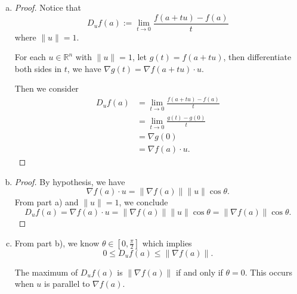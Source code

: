 \begin{Exercise}
\begin{enumerate}[a)]
\item
\begin{proof}
Notice that
$$
D_u f(a) := \lim_{t\to 0}\frac{f(a+t u)-f(a)}{t}
$$
where $\| u \| = 1$.

For each $u\in\mathbb{R}^n$ with $\| u \| = 1$, let $g(t) = f(a+t u)$, then differentiate both sides in $t$, we have $\nabla g(t) = \nabla f(a+t u)\cdot u$.

Then we consider
\begin{align*}
D_u f(a) 
&= \lim_{t\to 0}\frac{f(a+t u)-f(a)}{t} \\
&= \lim_{t\to 0}\frac{g(t)-g(0)}{t} \\
&= \nabla g(0) \\
&= \nabla f(a)\cdot u.
\end{align*}
\end{proof}

\item
\begin{proof}
By hypothesis, we have
$$
\nabla f(a) \cdot u = \| \nabla f(a) \| \| u \| \cos \theta.
$$
From part a) and $\| u \| = 1$, we conclude
$$
D_u f(a) = \nabla f(a)\cdot u = \| \nabla f(a) \| \| u \| \cos \theta =  \| \nabla f(a) \| \cos \theta.
$$
\end{proof}

\item
\begin{solution}
From part b), we know $\theta \in [0,\frac{\pi}{2}]$ which implies 
$$
0\leq D_u f(a) \leq \| \nabla f(a) \|.
$$

The maximum of $D_u f(a)$ is $\| \nabla f(a) \|$ if and only if $\theta = 0$. This occurs when $u$ is parallel to $\nabla f(a)$.
\end{solution}
\end{enumerate}
\end{Exercise}